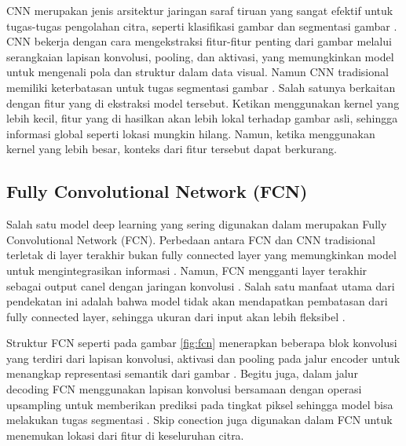 \noindent CNN merupakan jenis arsitektur jaringan saraf tiruan yang sangat efektif untuk tugas-tugas pengolahan citra, seperti klasifikasi gambar dan segmentasi gambar \cite{celeghin_convolutional_2023}. CNN bekerja dengan cara mengekstraksi fitur-fitur penting dari gambar melalui serangkaian lapisan konvolusi, pooling, dan aktivasi, yang memungkinkan model untuk mengenali pola dan struktur dalam data visual. Namun CNN tradisional memiliki keterbatasan untuk tugas segmentasi  gambar \cite{huang_fully_2022, azad_medical_2022, jasim_towards_2023}. Salah satunya berkaitan dengan fitur yang di ekstraksi model tersebut. Ketikan menggunakan kernel yang lebih kecil, fitur yang di hasilkan akan lebih lokal terhadap gambar asli, sehingga informasi global seperti lokasi mungkin hilang. Namun, ketika menggunakan kernel yang lebih besar, konteks dari fitur tersebut dapat berkurang.


\subsection{Fully Convolutional Network (FCN)}

Salah satu model deep learning yang sering digunakan dalam merupakan Fully Convolutional Network (FCN). Perbedaan antara FCN dan CNN tradisional terletak di layer terakhir bukan fully connected layer yang memungkinkan model untuk mengintegrasikan informasi . Namun, FCN mengganti layer terakhir sebagai output canel dengan jaringan konvolusi \cite{shlezinger_model-based_2023,huang_fully_2022}. Salah satu manfaat utama dari pendekatan ini adalah bahwa model tidak akan mendapatkan pembatasan dari fully connected layer, sehingga ukuran dari input akan lebih fleksibel \cite{iqbal_analyses_2023}.


Struktur FCN seperti pada gambar \ref{fig:fcn} menerapkan beberapa blok konvolusi yang terdiri dari lapisan konvolusi, aktivasi dan pooling pada jalur encoder untuk menangkap representasi semantik dari gambar \cite{azad_medical_2022}. Begitu juga, dalam jalur decoding FCN menggunakan lapisan konvolusi bersamaan dengan operasi upsampling untuk memberikan prediksi pada tingkat piksel sehingga model bisa melakukan tugas segmentasi \cite{deng_fcn_2023}. Skip conection juga digunakan dalam FCN untuk menemukan lokasi dari fitur di keseluruhan citra. 

